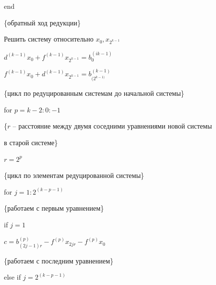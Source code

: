 {\hspace{.5cm}

end





\{обратный ход редукции\}



Решить систему относительно $x_0, x_{2^{k-1}}$



$d^{(k-1)}x_0 + f^{(k-1)}x_{2^{k-1}}=b^{(ik-1)}_0$



$f^{(k-1)}x_0 + d^{(k-1)}x_{2^{k-1}}=b^{(k-1)}_{(2^{k-1)}}$



\{цикл по редуцированным системам до начальной системы\}



for $p=k-2:0:-1$



\{$r$ -- расстояние между двумя соседними уравнениями новой системы 



в старой системе\}



$r=2^p$



\{цикл по элементам редуцированной системы\}



\hspace{.5cm} for $j=1:2^{(k-p-1)}$



\hspace{.5cm} \{работаем с первым уравнением\}



\hspace{.5cm}\hspace{.5cm} if $j=1 $



\hspace{.5cm}\hspace{.5cm}\hspace{.5cm}

$ c=b^{(p)}_{(2j-1)r}-f^{(p)}x_{2jr}-f^{(p)}x_0$



\hspace{.5cm}

\{работаем с последним уравнением\}



\hspace{.5cm}\hspace{.5cm} else if $j=2^{(k-p-1)}$



}
